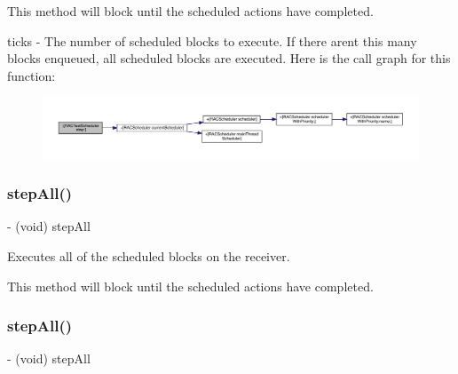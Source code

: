 This method will block until the scheduled actions have completed.

ticks -\/ The number of scheduled blocks to execute. If there aren\textquotesingle{}t this many blocks enqueued, all scheduled blocks are executed. Here is the call graph for this function\+:\nopagebreak
\begin{figure}[H]
\begin{center}
\leavevmode
\includegraphics[width=350pt]{interface_r_a_c_test_scheduler_a74b5961a618f9692baf91bbd52ab08e7_cgraph}
\end{center}
\end{figure}
\mbox{\label{interface_r_a_c_test_scheduler_a2577a57067b00fa4e08414f168359370}} 
\subsubsection{\texorpdfstring{step\+All()}{stepAll()}\hspace{0.1cm}{\footnotesize\ttfamily [1/3]}}
{\footnotesize\ttfamily -\/ (void) step\+All \begin{DoxyParamCaption}{ }\end{DoxyParamCaption}}

Executes all of the scheduled blocks on the receiver.

This method will block until the scheduled actions have completed. \mbox{\label{interface_r_a_c_test_scheduler_a2577a57067b00fa4e08414f168359370}} 
\subsubsection{\texorpdfstring{step\+All()}{stepAll()}\hspace{0.1cm}{\footnotesize\ttfamily [2/3]}}
{\footnotesize\ttfamily -\/ (void) step\+All \begin{DoxyParamCaption}{ }\end{DoxyParamCaption}}

